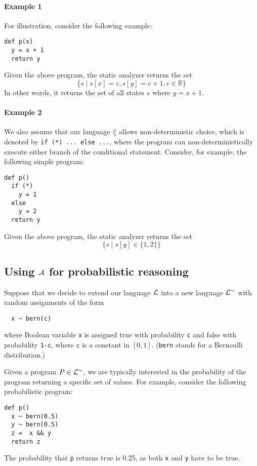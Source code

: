 \documentclass[11pt, oneside]{article}   	%
\begin{document}
\paragraph{Example 1}
For illustration, consider the following example:
%
\begin{verbatim}
def p(x)
  y = x + 1
  return y
\end{verbatim}
%
Given the above program, the static analyzer returns
the set
$$\{s \mid s[x] = c, s[y] = c + 1, c \in \mathds{R}\}$$
In other words, it returns the set of all states $s$ where $y = x + 1$.

\paragraph{Example 2}
We also assume that our language $\lang$ allows non-deterministic
choice, which is denoted by \texttt{if (*) ... else ...},
where the program can non-deterministically execute either branch of the
conditional statement.
Consider, for example, the following simple program:
\begin{verbatim}
def p()
  if (*)
    y = 1
  else
    y = 2
  return y
\end{verbatim}
Given the above program, the static analyzer returns the set
$$\{ s \mid s[y] \in \{1,2\}\}$$


\subsection{Using $\mathcal{A}$ for probabilistic reasoning}
\label{sec:proba}

Suppose that we decide to extend our language
$\mathcal{L}$ into a new language $\mathcal{L}^\sim$ with random assignments of the form
\begin{verbatim}
  x ~ bern(c)
\end{verbatim}
where Boolean variable \texttt{x} is assigned true with probability \texttt{c}
and false with probability \texttt{1-c}, where $\texttt{c}$ is a constant in $ [0,1]$.
(\texttt{bern} stands for a Bernoulli distribution.)

Given a program $P \in \mathcal{L}^\sim$, we are typically
interested in the probability of the program returning
a specific set of values.
For example, consider the following probabilistic program:
\begin{verbatim}
def p()
  x ~ bern(0.5)
  y ~ bern(0.5)
  z =  x && y
  return z
\end{verbatim}
The probability that \texttt{p} returns true
is 0.25, as both \texttt{x} and \texttt{y} have to be true.
\end{document}
